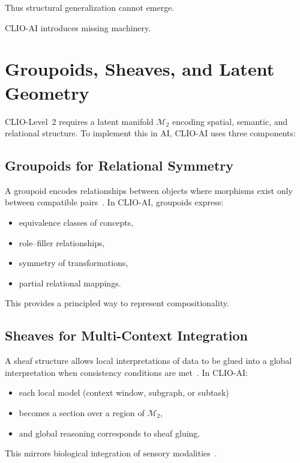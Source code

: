 \documentclass[12pt,oneside]{book}
\theoremstyle{plain}
\theoremstyle{definition}
\let\citep\parencite
\begin{document}
Thus structural generalization cannot emerge.

CLIO-AI introduces missing machinery.

\section{Groupoids, Sheaves, and Latent Geometry}

CLIO-Level~2 requires a latent manifold $\mathcal{M}_2$ encoding
spatial, semantic, and relational structure.
To implement this in AI, CLIO-AI uses three components:

\subsection{Groupoids for Relational Symmetry}

A groupoid encodes relationships between objects where morphisms exist only
between compatible pairs~\citep{leinster2016basic}.
In CLIO-AI, groupoids express:

\begin{itemize}
    \item equivalence classes of concepts,
    \item role–filler relationships,
    \item symmetry of transformations,
    \item partial relational mappings.
\end{itemize}

This provides a principled way to represent compositionality.

\subsection{Sheaves for Multi-Context Integration}

A sheaf structure allows local interpretations of data to be glued into a global
interpretation when consistency conditions are met~\citep{curry2018many}.
In CLIO-AI:

\begin{itemize}
    \item each local model (context window, subgraph, or subtask)
    \item becomes a section over a region of $\mathcal{M}_2$,
    \item and global reasoning corresponds to sheaf gluing.
\end{itemize}

This mirrors biological integration of sensory modalities~\citep{solms2021hidden}.
\end{document}
